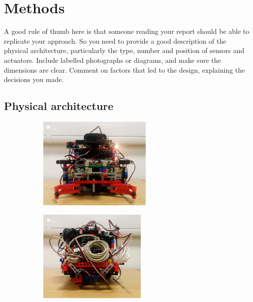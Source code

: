 \section{Methods}

A good rule of thumb here is that someone reading your report should be able to replicate your approach. So you need to provide a good description of the physical architecture, particularly the type, number and position of sensors and actuators. Include labelled photographs or diagrams, and make sure the dimensions are clear. Comment on factors that led to the design, explaining the decisions you made.


\subsection{Physical architecture}

\begin{figure}[ht]
    \centering
    \begin{subfigure}{0.45\textwidth}
        \includegraphics[width=\linewidth, height=4.5cm]{res/robot-pics/view-front.jpg}
        \caption{}
        \label{fig:}
    \end{subfigure}
    \begin{subfigure}{0.45\textwidth}
        \includegraphics[width=\linewidth, height=4.5cm]{res/robot-pics/view-back.jpg}
        \caption{}
        \label{fig:}
    \end{subfigure}
    \caption{}
    \label{fig:}
\end{figure}

